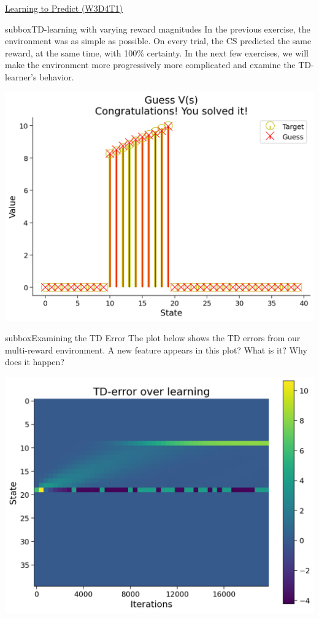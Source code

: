 \begin{textbox}{\href{https://compneuro.neuromatch.io/tutorials/W3D4_ReinforcementLearning/student/W3D4_Tutorial1.html}{Learning to Predict (W3D4T1)} }
\begin{subbox}{subbox}{TD-learning with varying reward magnitudes}
\scriptsize
In the previous exercise, the environment was as simple as possible. On every trial, the CS predicted the same reward, at the same time, with 100\% certainty. In the next few exercises, we will make the environment more progressively more complicated and examine the TD-learner's behavior.
\begin{center}
    
\includegraphics[scale=0.15]{Figures/RL/RL_Figure4.png}
\end{center}

\end{subbox}
\begin{subbox}{subbox}{Examining the TD Error}
\scriptsize
The plot below shows the TD errors from our multi-reward environment. A new feature appears in this plot? What is it? Why does it happen?
\begin{center}
    
\includegraphics[scale=0.15]{Figures/RL/RL_Figure5.png}
\end{center}


\end{subbox}
\end{textbox}
